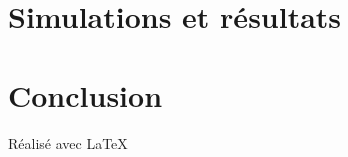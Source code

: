 \documentclass[a4paper]{report}
\theoremstyle{definition}
\begin{document}
\setcounter{tocdepth}{3}
\tableofcontents
\thispagestyle{empty}











\chapter{Simulations et r\'esultats}\label{simu}



\chapter{Conclusion}\label{conclusion}





\vfill
{\raggedleft R\'ealis\'e avec \LaTeX{} \par}
\end{document}
